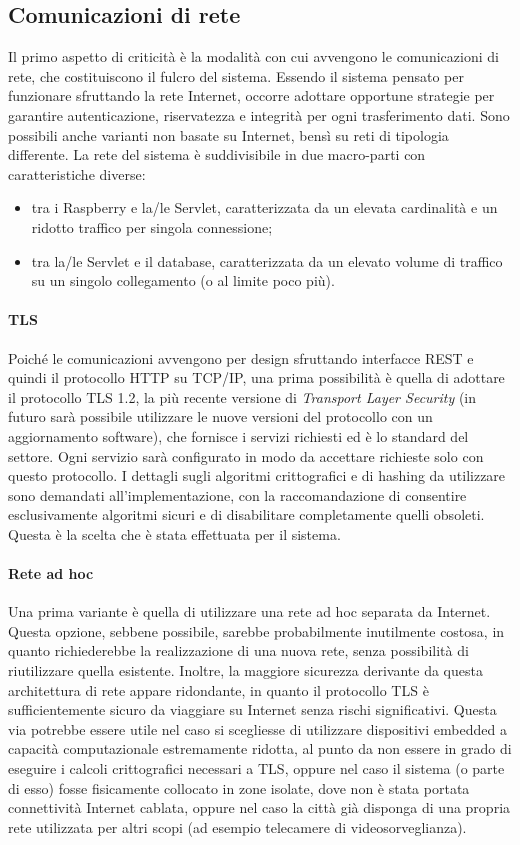\subsection{Comunicazioni di rete}
Il primo aspetto di criticità è la modalità con cui avvengono le comunicazioni di rete, che costituiscono il fulcro del sistema.
Essendo il sistema pensato per funzionare sfruttando la rete Internet, occorre adottare opportune strategie per garantire autenticazione, riservatezza e integrità per ogni trasferimento dati.
Sono possibili anche varianti non basate su Internet, bensì su reti di tipologia differente.
La rete del sistema è suddivisibile in due macro-parti con caratteristiche diverse:
\begin{itemize}
 \item tra i Raspberry e la/le Servlet, caratterizzata da un elevata cardinalità e un ridotto traffico per singola connessione;
 \item tra la/le Servlet e il database, caratterizzata da un elevato volume di traffico su un singolo collegamento (o al limite poco più).
\end{itemize}
\paragraph{TLS}
Poiché le comunicazioni avvengono per design sfruttando interfacce REST e quindi il protocollo HTTP su TCP/IP, una prima possibilità è quella di adottare il protocollo TLS 1.2, la più recente versione di \textit{Transport Layer Security} (in futuro sarà possibile utilizzare le nuove versioni del protocollo con un aggiornamento software), che fornisce i servizi richiesti ed è lo standard del settore.
Ogni servizio sarà configurato in modo da accettare richieste solo con questo protocollo.
I dettagli sugli algoritmi crittografici e di hashing da utilizzare sono demandati all'implementazione, con la raccomandazione di consentire esclusivamente algoritmi sicuri e di disabilitare completamente quelli obsoleti.
Questa è la scelta che è stata effettuata per il sistema.
\paragraph{Rete ad hoc}
Una prima variante è quella di utilizzare una rete ad hoc separata da Internet.
Questa opzione, sebbene possibile, sarebbe probabilmente inutilmente costosa, in quanto richiederebbe la realizzazione di una nuova rete, senza possibilità di riutilizzare quella esistente.
Inoltre, la maggiore sicurezza derivante da questa architettura di rete appare ridondante, in quanto il protocollo TLS è sufficientemente sicuro da viaggiare su Internet senza rischi significativi.
Questa via potrebbe essere utile nel caso si scegliesse di utilizzare dispositivi embedded a capacità computazionale estremamente ridotta, al punto da non essere in grado di eseguire i calcoli crittografici necessari a TLS, oppure nel caso il sistema (o parte di esso) fosse fisicamente collocato in zone isolate, dove non è stata portata connettività Internet cablata, oppure nel caso la città già disponga di una propria rete utilizzata per altri scopi (ad esempio telecamere di videosorveglianza).

